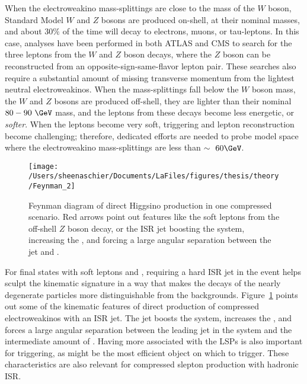 When the electroweakino mass-splittings are close to the mass of the $W$ boson, Standard Model $W$ and $Z$ bosons are produced on-shell, at their nominal masses, and about $30\%$ of the time will decay to electrons, muons, or tau-leptons.  In this case, analyses have been performed in both ATLAS and CMS to search for the three leptons from the $W$ and $Z$ boson decays, where the $Z$ boson can be reconstructed from an opposite-sign-same-flavor lepton pair.  These searches also require a substantial amount of missing transverse momentum from the lightest neutral electroweakinos.  When the mass-splittings fall below the $W$ boson mass, the $W$ and $Z$ bosons are produced off-shell, they are lighter than their nominal $80-90~\GeV$ mass, and the leptons from these decays become less energetic, or \textit{softer}.  When the leptons become very soft, triggering and lepton reconstruction become challenging; therefore, dedicated efforts are needed to probe model space where the electroweakino mass-splittings are less than $\sim~60\GeV$. 
   \begin{figure}%
  \begin{center}
  \texttt{[image: /Users/sheenaschier/Documents/LaFiles/figures/thesis/theory/Feynman\_2]}
   \end{center}
 \caption{Feynman diagram of direct Higgsino production in one compressed scenario.  Red arrows point out features like the soft leptons from the off-shell $Z$ boson decay, or the ISR jet boosting the system, increasing the \met, and forcing a large angular separation between the jet and \met.}
 \label{fig:fn3}
 \end{figure}
For final states with soft leptons and \met{}, requiring a hard ISR jet in the event helps sculpt the kinematic signature in a way that makes the decays of the nearly degenerate particles more distinguishable from the backgrounds.  Figure~\ref{fig:fn3} points out some of the kinematic features of direct production of compressed electroweakinos with an ISR jet.   The jet boosts the system, increases the \met, and forces a large angular separation between the leading jet in the system and the intermediate amount of \met.  Having more \met associated with the LSPs is also important for triggering, as \met might be the most efficient object on which to trigger.  These characteristics are also relevant for compressed slepton production with hadronic ISR.  

